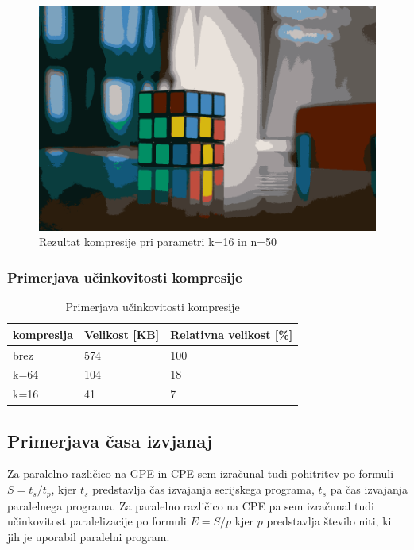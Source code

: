 \documentclass[11pt]{article}
\begin{document}
\begin{figure}[H]
    \includegraphics[scale=0.2]{out_16}
    \centering
    \caption{Rezultat kompresije pri parametri k=16 in n=50}
\end{figure}

\subsubsection{Primerjava učinkovitosti kompresije}
\begin{table}[h]
    \centering
    \begin{tabular}{l | l | l}
        kompresija & Velikost [KB] & Relativna velikost [\%] \\
        \hline
        brez       & 574           & 100                     \\
        \hline
        k=64       & 104           & 18                      \\
        \hline
        k=16       & 41            & 7                       \\
    \end{tabular}
    \caption{Primerjava učinkovitosti kompresije}
\end{table}

\subsection{Primerjava časa izvjanaj}

Za paralelno različico na GPE in CPE sem izračunal tudi pohitritev po formuli $S=t_s/t_p$, kjer $t_s$ predstavlja čas izvajanja serijskega programa, $t_s$ pa čas izvajanja paralelnega programa.
Za paralelno različico na CPE pa sem izračunal tudi učinkovitost paralelizacije po formuli $E=S/p$ kjer $p$ predstavlja število niti, ki jih je uporabil paralelni program.
\end{document}
